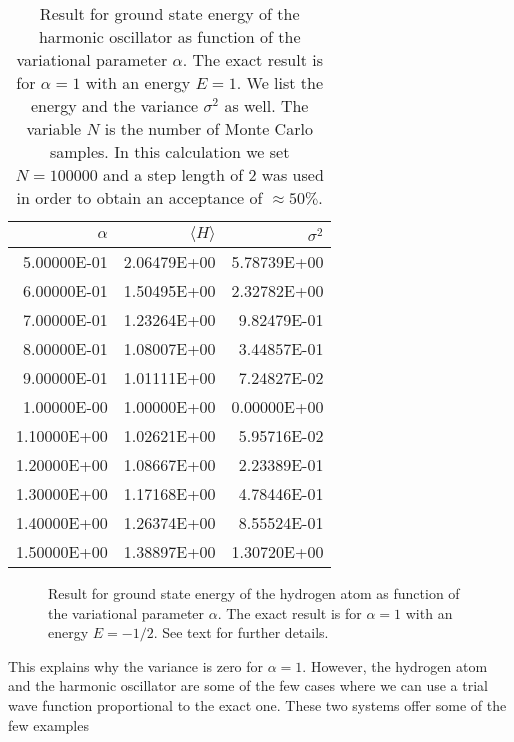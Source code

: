 \begin{table}[hbtp]
\begin{center}
\caption{Result  for ground state energy of the harmonic oscillator as
         function of the variational parameter $\alpha$. The exact result
         is for $\alpha=1$ with an energy $E=1$. We list the energy 
         and the variance $\sigma^2$ as well. The variable $N$ is the number of Monte Carlo
         samples. In this calculation we set $N=100000$ and a step length of 
         2 was used in order to obtain an acceptance of $\approx 50\%$.
         \label{tab:tabhovmc}}
\begin{tabular}{rrr}\hline
$\alpha$&$\langle H \rangle $&$\sigma^2$\\\hline
 5.00000E-01 &  2.06479E+00 &  5.78739E+00 \\ 
 6.00000E-01 &  1.50495E+00 &  2.32782E+00 \\ 
 7.00000E-01 &  1.23264E+00 &  9.82479E-01 \\ 
 8.00000E-01 &  1.08007E+00 &  3.44857E-01 \\ 
 9.00000E-01 &  1.01111E+00 &  7.24827E-02 \\ 
 1.00000E-00 &  1.00000E+00 &  0.00000E+00 \\ 
 1.10000E+00 &  1.02621E+00 &  5.95716E-02 \\ 
 1.20000E+00 &  1.08667E+00 &  2.23389E-01 \\ 
 1.30000E+00 &  1.17168E+00 &  4.78446E-01 \\ 
 1.40000E+00 &  1.26374E+00 &  8.55524E-01 \\ 
 1.50000E+00 &  1.38897E+00 &  1.30720E+00 \\ \hline
\end{tabular}
\end{center}
\end{table}
\begin{figure}
\begin{center}

\end{center}
\caption{Result  for ground state energy of the hydrogen atom as
         function of the variational parameter $\alpha$. The exact result
         is for $\alpha=1$ with an energy $E=-1/2$. 
         See text for further details.\label{fig:hydrogenvmc}}
\end{figure}
This explains why the variance is zero for $\alpha=1$. 
However, the hydrogen atom and the harmonic oscillator are
some of the few cases where we can use a trial wave function proportional
to the exact one. These two systems offer some of the few examples 
